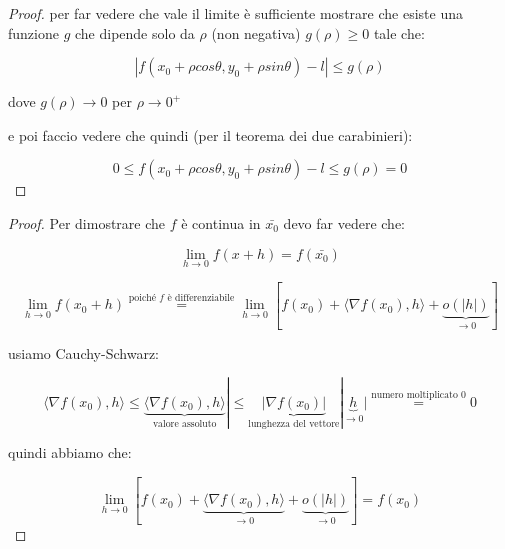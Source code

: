 \documentclass[11pt]{article}
\begin{document}
\begin{proof}
       per far vedere che vale il limite è sufficiente mostrare che esiste una funzione $g$ che dipende solo da $\rho$ (non negativa) $g(\rho)\ge 0$ tale che:

       \[
        |f(x_0+\rho cos\theta, y_0+\rho sin \theta ) -l| \le  g(\rho)
       \]

       dove $g(\rho) \rightarrow 0$ per $\rho \rightarrow 0^{+}$

       e poi faccio vedere che quindi (per il teorema dei due carabinieri):

       \[
        0\le f(x_0+\rho cos\theta, y_0+\rho sin \theta ) -l \le  g(\rho) = 0
       \]

\end{proof}
\newpage
{}
\begin{proof}
     Per dimostrare che $f$ è continua in $\bar{x_0} $ devo far vedere che:

     \[
         \lim_{ h \to 0 } f(x+h) = f( \bar{x_0} ) 
     \]

     \[
        \lim_{ h \to 0 } f(x_0 + h ) \overset{\text{poiché $f$ è differenziabile}}{=} \lim_{ h \to 0 } [f(x_0) + \langle \nabla f(x_0),h \rangle + \underbrace{o(|h|)}_\text{$\rightarrow 0$}]
     \]

     usiamo Cauchy-Schwarz:

     \[
        \langle \nabla f(x_0),h \rangle   \le  \underbrace{\langle \nabla f(x_0),h \rangle}_\text{valore assoluto}| \le  \underbrace{|\nabla f(x_0)|}_\text{lunghezza del vettore} | \underbrace{h}_\text{$\rightarrow 0$}| \overset{\text{numero moltiplicato $0$}}{=} 0
     \]

     quindi abbiamo che:

     \[
         \lim_{ h \to 0 } [f(x_0) + \underbrace{\langle \nabla f(x_0),h \rangle}_\text{$\rightarrow 0$} + \underbrace{o(|h|)}_\text{$\rightarrow 0$}] = f(x_0)
     \]
\end{proof}
\newpage
{}
\end{document}
